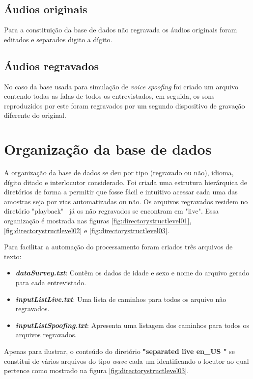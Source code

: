 		\subsection{Áudios originais}
			\par Para a constituição da base de dados não regravada os áudios originais foram editados e separados digito a dígito.

		\subsection{Áudios regravados}
			\par No caso da base usada para simulação de \textit{voice spoofing} foi criado um arquivo contendo todas as falas de todos os entrevistados, em seguida, os sons reproduzidos por este foram regravados por um segundo dispositivo de gravação diferente do original.

	\section{Organização da base de dados}
		\par A organização da base de dados se deu por tipo (regravado ou não), idioma, dígito ditado e interlocutor considerado. Foi criada uma estrutura hierárquica de diretórios de forma a permitir que fosse fácil e intuitivo acessar cada uma das amostras seja por vias automatizadas ou não. Os arquivos regravados residem no diretório "playback" \ já os não regravados se encontram em "live".	Essa organização é mostrada nas figuras \ref{fig:directorystructlevel01}, \ref{fig:directorystructlevel02} e \ref{fig:directorystructlevel03}.
		
		\par Para facilitar a automação do processamento foram criados três arquivos de texto:
		\begin{itemize}
			\item \textit{\textbf{dataSurvey.txt}}: Contêm os dados de idade e sexo e nome do arquivo gerado para cada entrevistado.
			\item \textit{\textbf{inputListLive.txt}}: Uma lista de caminhos para todos os arquivo não regravados.
			\item \textit{\textbf{inputListSpoofing.txt}}: Apresenta uma listagem dos caminhos para todos os arquivos regravados.
		\end{itemize}
	
		\par Apenas para ilustrar, o conteúdo do diretório \textbf{"separated \textfractionsolidus live \textfractionsolidus en\_US "} se constitui de vários arquivos do tipo \textit{wave} cada um identificando o locutor ao qual pertence como mostrado na  figura \ref{fig:directorystructlevel03}.
			
